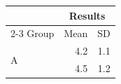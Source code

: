 \documentclass[11pt]{article}
\begin{document}
\begin{tabular}{lrr}\toprule
&\multicolumn{2}{c}{Results}\\\cmidrule(lr){2-3}
Group & Mean & SD\\\midrule
\multirow{2}{*}{A} & 4.2 & 1.1\\ & 4.5 & 1.2\\\bottomrule
\end{tabular}
\end{document}
